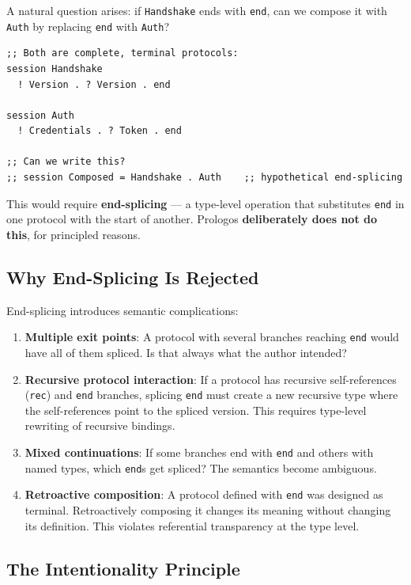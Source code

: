 \documentclass[11pt]{article}
\begin{document}
A natural question arises: if \texttt{Handshake} ends with \texttt{end}, can we compose it
with \texttt{Auth} by replacing \texttt{end} with \texttt{Auth}?

\begin{verbatim}
;; Both are complete, terminal protocols:
session Handshake
  ! Version . ? Version . end

session Auth
  ! Credentials . ? Token . end

;; Can we write this?
;; session Composed = Handshake . Auth    ;; hypothetical end-splicing
\end{verbatim}

This would require \textbf{end-splicing} --- a type-level operation that substitutes
\texttt{end} in one protocol with the start of another. Prologos \textbf{deliberately does
not do this}, for principled reasons.
\subsection{Why End-Splicing Is Rejected}
\label{sec:org81e1389}

End-splicing introduces semantic complications:

\begin{enumerate}
\item \textbf{Multiple exit points}: A protocol with several branches reaching \texttt{end}
would have all of them spliced. Is that always what the author intended?

\item \textbf{Recursive protocol interaction}: If a protocol has recursive
self-references (\texttt{rec}) and \texttt{end} branches, splicing \texttt{end} must create a
new recursive type where the self-references point to the spliced version.
This requires type-level rewriting of recursive bindings.

\item \textbf{Mixed continuations}: If some branches end with \texttt{end} and others with
named types, which \texttt{end}​s get spliced? The semantics become ambiguous.

\item \textbf{Retroactive composition}: A protocol defined with \texttt{end} was designed as
terminal. Retroactively composing it changes its meaning without changing
its definition. This violates referential transparency at the type level.
\end{enumerate}
\subsection{The Intentionality Principle}
\label{sec:orgfcd196b}
\end{document}
